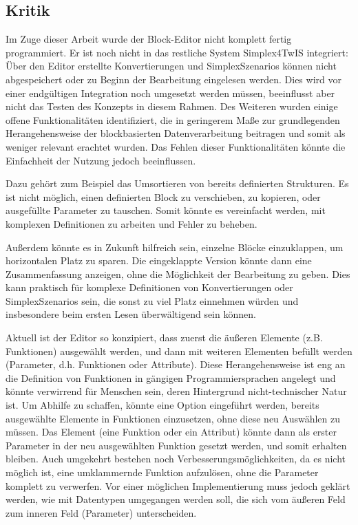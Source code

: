 \subsection{Kritik}
\label{sec:criticism}

Im Zuge dieser Arbeit wurde der Block-Editor nicht komplett fertig programmiert. Er ist noch nicht in das restliche System Simplex4TwIS integriert: Über den Editor erstellte Konvertierungen und SimplexSzenarios können nicht abgespeichert oder zu Beginn der Bearbeitung eingelesen werden. Dies wird vor einer endgültigen Integration noch umgesetzt werden müssen, beeinflusst aber nicht das Testen des Konzepts in diesem Rahmen. Des Weiteren wurden einige offene Funktionalitäten identifiziert, die in geringerem Maße zur grundlegenden Herangehensweise der blockbasierten Datenverarbeitung beitragen und somit als weniger relevant erachtet wurden. Das Fehlen dieser Funktionalitäten könnte die Einfachheit der Nutzung jedoch beeinflussen.

Dazu gehört zum Beispiel das Umsortieren von bereits definierten Strukturen. Es ist nicht möglich, einen definierten Block zu verschieben, zu kopieren, oder ausgefüllte Parameter zu tauschen. Somit könnte es vereinfacht werden, mit komplexen Definitionen zu arbeiten und Fehler zu beheben.

Außerdem könnte es in Zukunft hilfreich sein, einzelne Blöcke einzuklappen, um horizontalen Platz zu sparen. Die eingeklappte Version könnte dann eine Zusammenfassung anzeigen, ohne die Möglichkeit der Bearbeitung zu geben. Dies kann praktisch für komplexe Definitionen von Konvertierungen oder SimplexSzenarios sein, die sonst zu viel Platz einnehmen würden und insbesondere beim ersten Lesen überwältigend sein können.

Aktuell ist der Editor so konzipiert, dass zuerst die äußeren Elemente (z.B. Funktionen) ausgewählt werden, und dann mit weiteren Elementen befüllt werden (Parameter, d.h. Funktionen oder Attribute). Diese Herangehensweise ist eng an die Definition von Funktionen in gängigen Programmiersprachen angelegt und könnte verwirrend für Menschen sein, deren Hintergrund nicht-technischer Natur ist. Um Abhilfe zu schaffen, könnte eine Option eingeführt werden, bereits ausgewählte Elemente in Funktionen einzusetzen, ohne diese neu Auswählen zu müssen. Das Element (eine Funktion oder ein Attribut) könnte dann als erster Parameter in der neu ausgewählten Funktion gesetzt werden, und somit erhalten bleiben. Auch umgekehrt bestehen noch Verbesserungsmöglichkeiten, da es nicht möglich ist, eine umklammernde Funktion aufzulösen, ohne die Parameter komplett zu verwerfen. Vor einer möglichen Implementierung muss jedoch geklärt werden, wie mit Datentypen umgegangen werden soll, die sich vom äußeren Feld zum inneren Feld (Parameter) unterscheiden.

